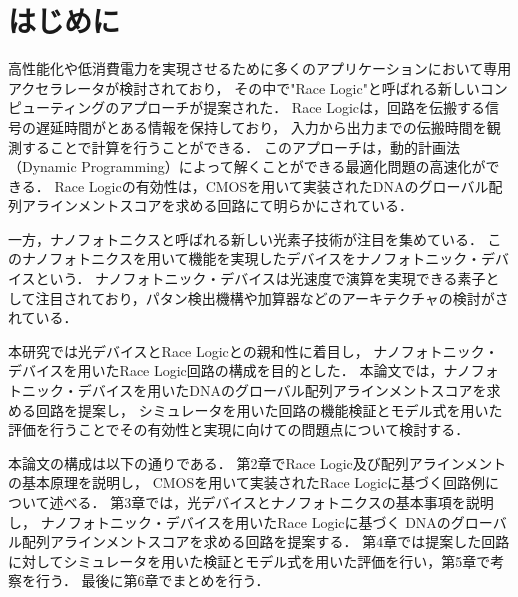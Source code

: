 \chapter{はじめに}
高性能化や低消費電力を実現させるために多くのアプリケーションにおいて専用アクセラレータが検討されており，
その中で"Race Logic"と呼ばれる新しいコンピューティングのアプローチが提案された\cite{madhavan2014race}．
Race Logicは，回路を伝搬する信号の遅延時間がとある情報を保持しており，
入力から出力までの伝搬時間を観測することで計算を行うことができる．
このアプローチは，動的計画法（Dynamic Programming）によって解くことができる最適化問題の高速化ができる．
Race Logicの有効性は，CMOSを用いて実装されたDNAのグローバル配列アラインメントスコアを求める回路にて明らかにされている．

一方，ナノフォトニクスと呼ばれる新しい光素子技術が注目を集めている．
このナノフォトニクスを用いて機能を実現したデバイスをナノフォトニック・デバイスという．
ナノフォトニック・デバイスは光速度で演算を実現できる素子として注目されており，パタン検出機構や加算器などのアーキテクチャの検討がされている．

本研究では光デバイスとRace Logicとの親和性に着目し，
ナノフォトニック・デバイスを用いたRace Logic回路の構成を目的とした．
本論文では，ナノフォトニック・デバイスを用いたDNAのグローバル配列アラインメントスコアを求める回路を提案し，
シミュレータを用いた回路の機能検証とモデル式を用いた評価を行うことでその有効性と実現に向けての問題点について検討する．

本論文の構成は以下の通りである．
第2章でRace Logic及び配列アラインメントの基本原理を説明し，
CMOSを用いて実装されたRace Logicに基づく回路例について述べる．
第3章では，光デバイスとナノフォトニクスの基本事項を説明し，
ナノフォトニック・デバイスを用いたRace Logicに基づく
DNAのグローバル配列アラインメントスコアを求める回路を提案する．
第4章では提案した回路に対してシミュレータを用いた検証とモデル式を用いた評価を行い，第5章で考察を行う．
最後に第6章でまとめを行う．

